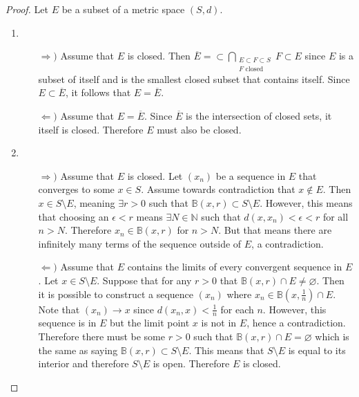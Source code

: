 \documentclass[../notes.tex]{subfiles}
\begin{document}
\begin{proof}
    Let $E$ be a subset of a metric space $(S,d)$.
    \begin{enumerate}
        \item
        \begin{enumerate}
            \item[$\Rightarrow)$] %
                Assume that $E$ is closed. Then $\displaystyle \overline{E} = \subset\bigcap_{\substack{E \subset F \subset S \\ F \text{ closed}}} F \subset E$ since $E$ is a subset of itself and is the smallest closed subset that contains itself. Since $E \subset \overline{E}$, it follows that $E = \overline{E}$.
            \item[$\Leftarrow)$] %
                Assume that $E = \overline{E}$. Since $\overline{E}$ is the intersection of closed sets, it itself is closed. Therefore $E$ must also be closed.
        \end{enumerate}
        \item
        \begin{enumerate}
            \item[$\Rightarrow)$] %
                Assume that $E$ is closed. Let $(x_n)$ be a sequence in $E$ that converges to some $x \in S$. Assume towards contradiction that $x \not\in E$. Then $x \in S\setminus E$, meaning $\exists r > 0$ such that $\mathbb{B}(x,r) \subset S\setminus E$. However, this means that choosing an $\epsilon < r$ means $\exists N \in \mathbb{N}$ such that $d(x, x_n) < \epsilon < r$ for all $n > N$. Therefore $x_n \in \mathbb{B}(x,r)$ for $n > N$. But that means there are infinitely many terms of the sequence outside of $E$, a contradiction.
            \item[$\Leftarrow)$] %
                Assume that $E$ contains the limits of every convergent sequence in $E$. Let $x \in S \setminus E$. Suppose that for any $r > 0$ that $\mathbb{B}(x,r) \cap E \neq \varnothing$. Then it is possible to construct a sequence $(x_n)$ where $x_n \in \mathbb{B}(x,\frac{1}{n}) \cap E$. Note that $(x_n) \to x$ since $d(x_n ,x) < \frac{1}{n}$ for each $n$. However, this sequence is in $E$ but the limit point $x$ is not in $E$, hence a contradiction. Therefore there must be some $r >0$ such that $\mathbb{B}(x,r) \cap E = \varnothing$ which is the same as saying $\mathbb{B}(x,r) \subset S \setminus E$. This means that $S \setminus E$ is equal to its interior and therefore $S \setminus E$ is open. Therefore $E$ is closed.

\end{enumerate}
\end{enumerate}
\end{proof}
\end{document}
